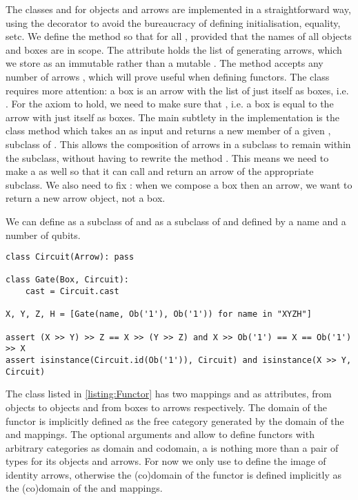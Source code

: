 The classes  and  for objects and arrows are implemented in a straightforward way, using the  decorator to avoid the bureaucracy of defining initialisation, equality, setc.
We define the method  so that  for all , provided that the names of all objects and boxes are in scope.
The attribute  holds the list of generating arrows, which we store as an immutable  rather than a mutable .
The method  accepts any number of arrows , which will prove useful when defining functors.
The  class requires more attention: a box  is an arrow with the list of just itself as boxes, i.e. .
For the axiom  to hold, we need to make sure that , i.e. a box is equal to the arrow with just itself as boxes.
The main subtlety in the implementation is the class method  which takes an  as input and returns a new member of a given , subclass of .
This allows the composition of arrows in a subclass to remain within the subclass, without having to rewrite the method .
This means we need to make  a  as well so that it can call  and return an arrow of the appropriate subclass.
We also need to fix : when we compose a box then an arrow, we want to return a new arrow object, not a box.

\begin{example}\label{example:Circuit}
We can define  as a subclass of  and  as a subclass of  and  defined by a name and a number of qubits.

\begin{verbatim}
class Circuit(Arrow): pass

class Gate(Box, Circuit):
    cast = Circuit.cast

X, Y, Z, H = [Gate(name, Ob('1'), Ob('1')) for name in "XYZH"]

assert (X >> Y) >> Z == X >> (Y >> Z) and X >> Ob('1') == X == Ob('1') >> X
assert isinstance(Circuit.id(Ob('1')), Circuit) and isinstance(X >> Y, Circuit)
\end{verbatim}
\end{example}

The  class listed in \ref{listing:Functor} has two mappings  and  as attributes, from objects to objects and from boxes to arrows respectively.
The domain of the functor is implicitly defined as the free category generated by the domain of the  and  mappings.
The optional arguments  and  allow to define functors with arbitrary categories as domain and codomain, a  is nothing more than a pair of types for its objects and arrows.
For now we only use  to define the image of identity arrows, otherwise the (co)domain of the functor is defined implicitly as the (co)domain of the  and  mappings.

